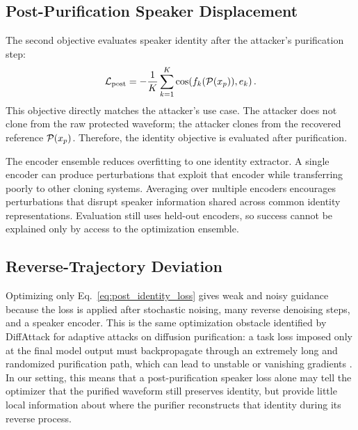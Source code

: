 \subsection{Post-Purification Speaker Displacement}

The second objective evaluates speaker identity after the attacker's purification step:
\begin{equation}
    \mathcal{L}_{\text{post}}
    =
    -\frac{1}{K}\sum_{k=1}^{K}
    \cos\!\left(f_k(\mathcal{P}(x_p)), e_k\right).
    \label{eq:post_identity_loss}
\end{equation}
This objective directly matches the attacker's use case. The attacker does not clone from the raw protected waveform; 
the attacker clones from the recovered reference $\mathcal{P}(x_p)$. Therefore, the identity objective is evaluated after purification.

The encoder ensemble reduces overfitting to one identity extractor. A single encoder can produce perturbations that exploit that encoder while transferring poorly to other cloning systems. 
Averaging over multiple encoders encourages perturbations that disrupt speaker information shared across common identity representations. Evaluation still uses held-out encoders, 
so success cannot be explained only by access to the optimization ensemble.

\subsection{Reverse-Trajectory Deviation}

Optimizing only Eq.~\eqref{eq:post_identity_loss} gives weak and noisy guidance because the loss is applied after stochastic noising, many reverse denoising steps, and a speaker encoder. 
This is the same optimization obstacle identified by DiffAttack for adaptive attacks on diffusion purification: a task loss imposed only at the final model output must backpropagate through an extremely long and randomized purification path, which can lead to unstable or vanishing gradients \cite{kang2023diffattack}. 
In our setting, this means that a post-purification speaker loss alone may tell the optimizer that the purified waveform still preserves identity, but provide little local information about where the purifier reconstructs that identity during its reverse process.

